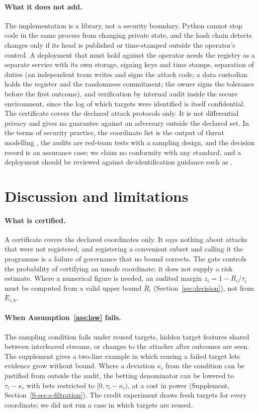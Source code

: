 \documentclass{jpc}
\theoremstyle{remark}
\begin{document}
\paragraph{What it does not add.} The implementation is a library, not a security boundary. Python cannot stop code in the same process from changing private state, and the hash chain detects changes only if its head is published or time-stamped outside the operator's control. A deployment that must hold against the operator needs the registry as a separate service with its own storage, signing keys and time stamps, separation of duties (an independent team writes and signs the attack code; a data custodian holds the register and the randomness commitment; the owner signs the tolerance before the first outcome), and verification by internal audit inside the secure environment, since the log of which targets were identified is itself confidential. The certificate covers the declared attack protocols only. It is not differential privacy and gives no guarantee against an adversary outside the declared set. In the terms of security practice, the coordinate list is the output of threat modelling \cite{shostack2014}, the audits are red-team tests with a sampling design, and the decision record is an assurance case; we claim no conformity with any standard, and a deployment should be reviewed against de-identification guidance such as \cite{nist800188}.

\section{Discussion and limitations}\label{sec:discussion}
\paragraph{What is certified.} A certificate covers the declared coordinates only. It says nothing about attacks that were not registered, and registering a convenient subset and calling it the programme is a failure of governance that no bound corrects. The gate controls the probability of certifying an unsafe coordinate; it does not supply a risk estimate. Where a numerical figure is needed, an audited margin $z_i=1-\overline{R}_i/\tau_i$ must be computed from a valid upper bound $\overline{R}_i$ (Section~\ref{sec:decision}), not from $E_{i,b}$.

\paragraph{When Assumption~\ref{ass:law} fails.} The sampling condition fails under reused targets, hidden target features shared between interleaved streams, or changes to the attacker after outcomes are seen. The supplement gives a two-line example in which reusing a failed target lets evidence grow without bound. Where a deviation $\kappa_i$ from the condition can be justified from outside the audit, the betting denominator can be lowered to $\tau_i-\kappa_i$ with bets restricted to $[0,\tau_i-\kappa_i)$, at a cost in power (Supplement, Section~\ref{S-sec:s-filtration}). The credit experiment draws fresh targets for every coordinate; we did not run a case in which targets are reused.
\end{document}

